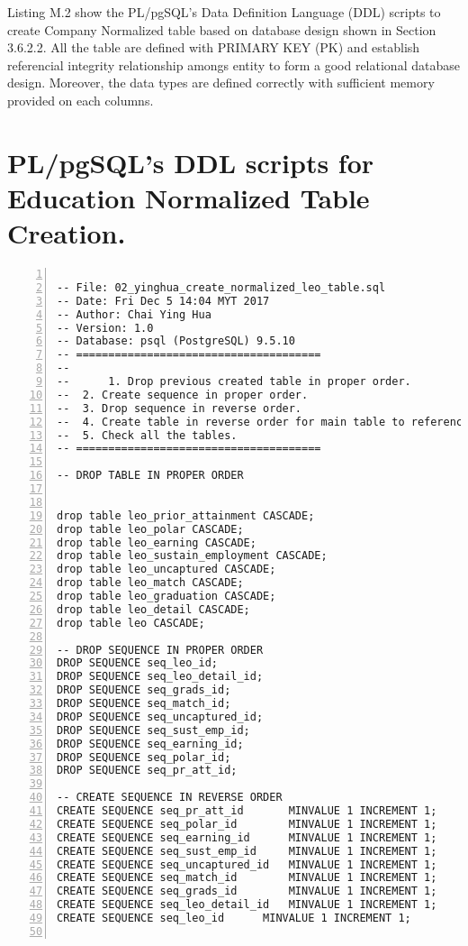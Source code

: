 Listing M.2 show the PL/pgSQL's Data Definition Language (DDL) scripts to create Company Normalized table based on database design shown in Section 3.6.2.2. All the table are defined with PRIMARY KEY (PK) and establish referencial integrity relationship amongs entity to form a good relational database design. Moreover, the data types are defined correctly with sufficient memory provided on each columns.

\pagebreak


\section{PL/pgSQL's DDL scripts for Education Normalized Table Creation.}
\lstset{basicstyle=\ttfamily\tiny}  
\begin{lstlisting}[breaklines, frame=single, numbers=left, caption={PL/pgSQL's DDL scripts for Education Normalized Table Creation.}, label=commandline-02]

-- File: 02_yinghua_create_normalized_leo_table.sql
-- Date: Fri Dec 5 14:04 MYT 2017
-- Author: Chai Ying Hua 
-- Version: 1.0 
-- Database: psql (PostgreSQL) 9.5.10
-- ======================================
-- 
--  	1. Drop previous created table in proper order. 
--	2. Create sequence in proper order. 
--	3. Drop sequence in reverse order. 
-- 	4. Create table in reverse order for main table to reference foreign key
--	5. Check all the tables. 
-- ======================================

-- DROP TABLE IN PROPER ORDER 


drop table leo_prior_attainment CASCADE; 
drop table leo_polar CASCADE;
drop table leo_earning CASCADE;
drop table leo_sustain_employment CASCADE;
drop table leo_uncaptured CASCADE; 
drop table leo_match CASCADE;
drop table leo_graduation CASCADE;
drop table leo_detail CASCADE;
drop table leo CASCADE;

-- DROP SEQUENCE IN PROPER ORDER 
DROP SEQUENCE seq_leo_id;
DROP SEQUENCE seq_leo_detail_id;
DROP SEQUENCE seq_grads_id;
DROP SEQUENCE seq_match_id;
DROP SEQUENCE seq_uncaptured_id;
DROP SEQUENCE seq_sust_emp_id;
DROP SEQUENCE seq_earning_id;
DROP SEQUENCE seq_polar_id;
DROP SEQUENCE seq_pr_att_id;

-- CREATE SEQUENCE IN REVERSE ORDER 
CREATE SEQUENCE seq_pr_att_id 		MINVALUE 1 INCREMENT 1; 
CREATE SEQUENCE seq_polar_id		MINVALUE 1 INCREMENT 1; 
CREATE SEQUENCE seq_earning_id		MINVALUE 1 INCREMENT 1; 
CREATE SEQUENCE seq_sust_emp_id 	MINVALUE 1 INCREMENT 1; 
CREATE SEQUENCE seq_uncaptured_id 	MINVALUE 1 INCREMENT 1; 
CREATE SEQUENCE seq_match_id		MINVALUE 1 INCREMENT 1; 
CREATE SEQUENCE seq_grads_id		MINVALUE 1 INCREMENT 1; 
CREATE SEQUENCE seq_leo_detail_id	MINVALUE 1 INCREMENT 1; 
CREATE SEQUENCE seq_leo_id		MINVALUE 1 INCREMENT 1;


\end{lstlisting}
